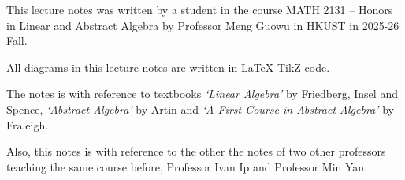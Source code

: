 \documentclass[
	11pt, %
	fleqn, %
	a4paper, %
]{LegrandOrangeBook}
\begin{document}
\pagestyle{empty} %

\tableofcontents %

\cleardoublepage %

\pagestyle{fancy} %

\newpage


\vspace{8pt}

\noindent This lecture notes was written by a student in the course MATH 2131 -- Honors in Linear and Abstract Algebra by Professor Meng Guowu in HKUST in 2025-26 Fall. 

\noindent All diagrams in this lecture notes are written in LaTeX TikZ code.

\noindent The notes is with reference to textbooks \textit{`Linear Algebra'} by Friedberg, Insel and Spence, \textit{`Abstract Algebra'} by Artin and \textit{`A First Course in Abstract Algebra'} by Fraleigh. 

\noindent Also, this notes is with reference to the other the notes of two other professors teaching the same course before, Professor Ivan Ip and Professor Min Yan.

\newpage


\vspace{8pt}
\end{document}
